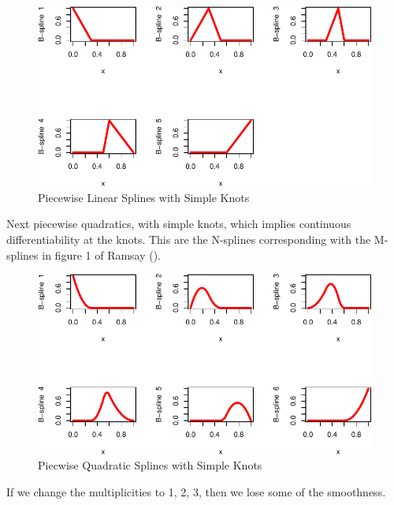\documentclass[
  12pt,
  letterpaper,
  DIV=11,
  numbers=noendperiod]{scrreprt}
\theoremstyle{remark}
\begin{document}
\begin{figure}[H]

{\centering \includegraphics{splinical_files/figure-pdf/order2mult1-1.pdf}

}

\caption{Piecewise Linear Splines with Simple Knots}

\end{figure}%

Next piecewise quadratics, with simple knots, which implies continuous
differentiability at the knots. This are the N-splines corresponding
with the M-splines in figure 1 of Ramsay
().

\begin{figure}[H]

{\centering \includegraphics{splinical_files/figure-pdf/order3mult1-1.pdf}

}

\caption{Piecwise Quadratic Splines with Simple Knots}

\end{figure}%

If we change the multiplicities to 1, 2, 3, then we lose some of the
smoothness.
\end{document}

